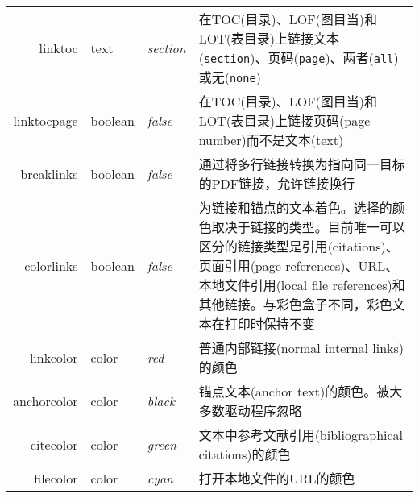 \documentclass{article}
\begin{document}
\begin{longtable}{@{}>{\ttfamily}rl>{\itshape}lp{8cm}@{}}
    linktoc        & text          & section    & 在TOC(目录)、LOF(图目当)和LOT(表目录)上链接文本(\verb|section|)、页码(\verb|page|)、两者(\verb|all|)或无(\verb|none|)                                                                                                                         \\
    linktocpage    & boolean       & false      & 在TOC(目录)、LOF(图目当)和LOT(表目录)上链接页码(page number)而不是文本(text)                                                                                                                                                               \\
    breaklinks     & boolean       & false      & 通过将多行链接转换为指向同一目标的PDF链接，允许链接换行                                                                                                                                                                                         \\
    colorlinks     & boolean       & false      & 为链接和锚点的文本着色。选择的颜色取决于链接的类型。目前唯一可以区分的链接类型是引用(citations)、页面引用(page references)、URL、本地文件引用(local file references)和其他链接。与彩色盒子不同，彩色文本在打印时保持不变                                                                               \\
    linkcolor      & color         & red        & 普通内部链接(normal internal links)的颜色                                                                                                                                                                                      \\
    anchorcolor    & color         & black      & 锚点文本(anchor text)的颜色。被大多数驱动程序忽略                                                                                                                                                                                       \\
    citecolor      & color         & green      & 文本中参考文献引用(bibliographical citations)的颜色                                                                                                                                                                               \\
    filecolor      & color         & cyan       & 打开本地文件的URL的颜色                                                                                                                                                                                                         \\

\end{longtable}
\end{document}
